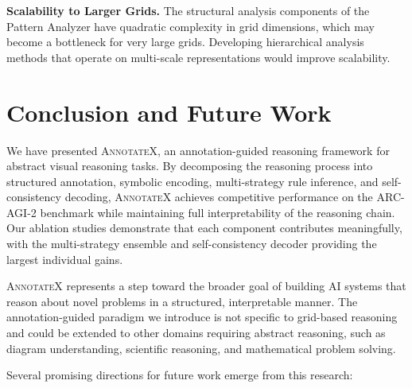 \documentclass[conference,10pt,letterpaper]{IEEEtran}
\newcommand{\annotatexname}{\textsc{AnnotateX}}
\begin{document}
\textbf{Scalability to Larger Grids.} The structural analysis components of the Pattern Analyzer have quadratic complexity in grid dimensions, which may become a bottleneck for very large grids. Developing hierarchical analysis methods that operate on multi-scale representations would improve scalability.

\section{Conclusion and Future Work}
\label{sec:conclusion}

We have presented \annotatexname, an annotation-guided reasoning framework for abstract visual reasoning tasks. By decomposing the reasoning process into structured annotation, symbolic encoding, multi-strategy rule inference, and self-consistency decoding, \annotatexname{} achieves competitive performance on the ARC-AGI-2 benchmark while maintaining full interpretability of the reasoning chain. Our ablation studies demonstrate that each component contributes meaningfully, with the multi-strategy ensemble and self-consistency decoder providing the largest individual gains.

\annotatexname{} represents a step toward the broader goal of building AI systems that reason about novel problems in a structured, interpretable manner. The annotation-guided paradigm we introduce is not specific to grid-based reasoning and could be extended to other domains requiring abstract reasoning, such as diagram understanding, scientific reasoning, and mathematical problem solving.

Several promising directions for future work emerge from this research:
\end{document}
